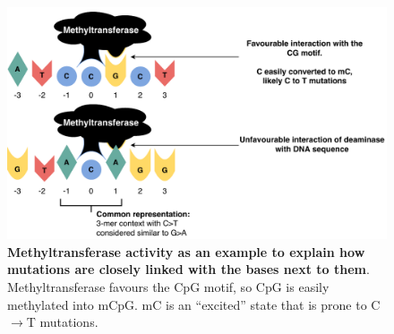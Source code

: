 \begin{figure}[h!]
    \centering
    \includegraphics[scale=0.78]{graphics/motif_demo.pdf}
    \caption{\textbf{Methyltransferase activity as an example to explain how mutations are closely linked with the bases next to them}. Methyltransferase favours the CpG motif, so CpG is easily methylated into mCpG. mC is an ``excited'' state that is prone to C$\rightarrow$T mutations.}
    \label{fig:motif_demo}
\end{figure}
